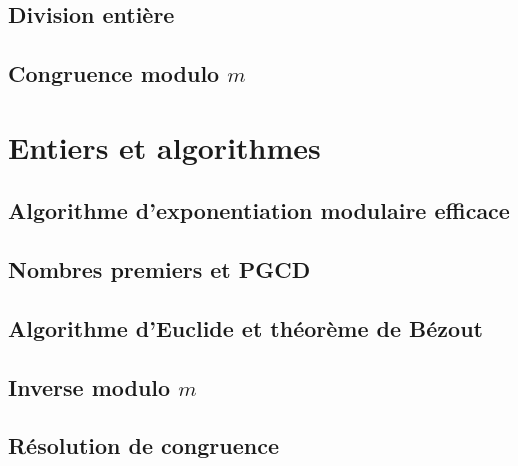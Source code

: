\documentclass[
  letterpaper,
]{scrbook}
\theoremstyle{plain}
\theoremstyle{definition}
\theoremstyle{definition}
\theoremstyle{remark}
\begin{document}
\hypertarget{division-entiuxe8re-1}{%
\subsection{Division entière}\label{division-entiuxe8re-1}}

\hypertarget{congruence-modulo-m}{%
\subsection{\texorpdfstring{Congruence modulo
\(m\)}{Congruence modulo m}}\label{congruence-modulo-m}}

\hypertarget{entiers-et-algorithmes}{%
\section{Entiers et algorithmes}\label{entiers-et-algorithmes}}

\hypertarget{algorithme-dexponentiation-modulaire-efficace}{%
\subsection{Algorithme d'exponentiation modulaire
efficace}\label{algorithme-dexponentiation-modulaire-efficace}}

\hypertarget{nombres-premiers-et-pgcd}{%
\subsection{Nombres premiers et PGCD}\label{nombres-premiers-et-pgcd}}

\hypertarget{algorithme-deuclide-et-thuxe9oruxe8me-de-buxe9zout}{%
\subsection{Algorithme d'Euclide et théorème de
Bézout}\label{algorithme-deuclide-et-thuxe9oruxe8me-de-buxe9zout}}

\hypertarget{inverse-modulo-m}{%
\subsection{\texorpdfstring{Inverse modulo
\(m\)}{Inverse modulo m}}\label{inverse-modulo-m}}

\hypertarget{ruxe9solution-de-congruence}{%
\subsection{Résolution de
congruence}\label{ruxe9solution-de-congruence}}
\end{document}
